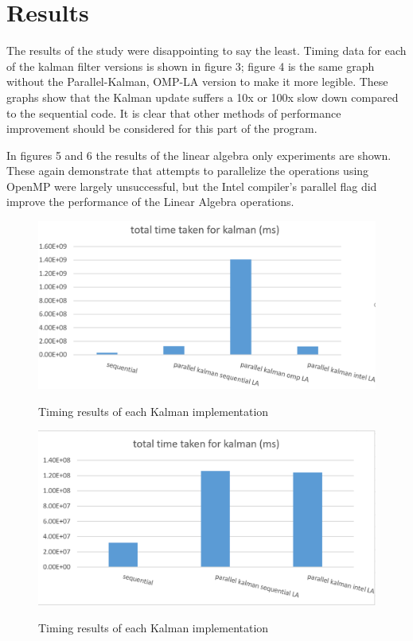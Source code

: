 \section{Results}

The results of the study were disappointing to say the least. Timing data for each of the kalman filter versions is shown in figure 3; figure 4 is the same graph without the Parallel-Kalman, OMP-LA version to make it more legible. These graphs show that the Kalman update suffers a 10x or 100x slow down compared to the sequential code. It is clear that other methods of performance improvement should be considered for this part of the program.

In figures 5 and 6 the results of the linear algebra only experiments are shown. These again demonstrate that attempts to parallelize the operations using OpenMP were largely unsuccessful, but the Intel compiler's parallel flag did improve the performance of the Linear Algebra operations. 


\begin{figure}[h]
\includegraphics[width=\textwidth]{results1.png}
\label{fig:all_kalman}
 \caption{Timing results of each Kalman implementation}
\end{figure}

\begin{figure}[h]
\includegraphics[width=\textwidth]{results2.png}
\label{fig:some_kalman}
 \caption{Timing results of each Kalman implementation}
\end{figure}



